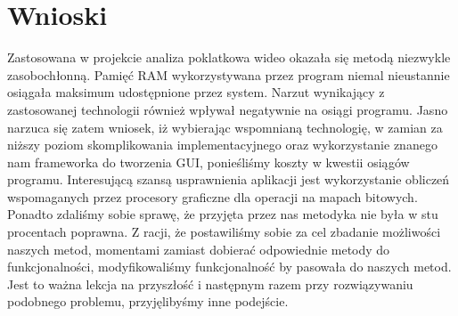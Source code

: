 \documentclass[a4paper]{article}
\begin{document}
\section{Wnioski}
Zastosowana w projekcie analiza poklatkowa wideo okazała się metodą niezwykle zasobochłonną. Pamięć RAM wykorzystywana przez program niemal nieustannie osiągała maksimum udostępnione przez system. Narzut wynikający z zastosowanej technologii również wpływał negatywnie na osiągi programu. Jasno narzuca się zatem wniosek, iż wybierając wspomnianą technologię, w zamian za niższy poziom skomplikowania implementacyjnego oraz wykorzystanie znanego nam frameworka do tworzenia GUI, ponieśliśmy koszty w kwestii osiągów programu. Interesującą szansą usprawnienia aplikacji jest wykorzystanie obliczeń wspomaganych przez procesory graficzne dla operacji na mapach bitowych.\\
Ponadto zdaliśmy sobie sprawę, że przyjęta przez nas metodyka nie była w stu procentach poprawna. Z racji, że postawiliśmy sobie za cel zbadanie możliwości naszych metod, momentami zamiast dobierać odpowiednie metody do funkcjonalności, modyfikowaliśmy funkcjonalność by pasowała do naszych metod. Jest to ważna lekcja na przyszłość i następnym razem przy rozwiązywaniu podobnego problemu, przyjęlibyśmy inne podejście.

\printbibliography[title={Bibliografia}]
\end{document}
